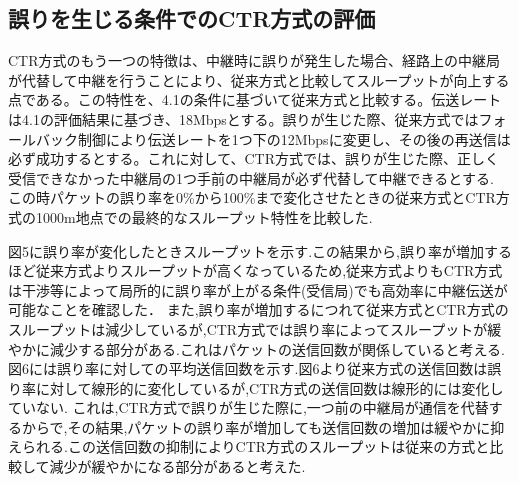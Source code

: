 \documentclass[a4paper,10.5pt]{ltjsarticle}  %
\begin{document}
\subsection{誤りを生じる条件でのCTR方式の評価}
CTR方式のもう一つの特徴は、中継時に誤りが発生した場合、経路上の中継局が代替して中継を行うことにより、従来方式と比較してスループットが向上する点である。この特性を、4.1の条件に基づいて従来方式と比較する。伝送レートは4.1の評価結果に基づき、18Mbpsとする。誤りが生じた際、従来方式ではフォールバック制御により伝送レートを1つ下の12Mbpsに変更し、その後の再送信は必ず成功するとする。これに対して、CTR方式では、誤りが生じた際、正しく受信できなかった中継局の1つ手前の中継局が必ず代替して中継できるとする.
この時パケットの誤り率を0\%から100\%まで変化させたときの従来方式とCTR方式の1000m地点での最終的なスループット特性を比較した.

図5に誤り率が変化したときスループットを示す.この結果から,誤り率が増加するほど従来方式よりスループットが高くなっているため,従来方式よりもCTR方式は干渉等によって局所的に誤り率が上がる条件(受信局)でも高効率に中継伝送が可能なことを確認した．
また,誤り率が増加するにつれて従来方式とCTR方式のスループットは減少しているが,CTR方式では誤り率によってスループットが緩やかに減少する部分がある.これはパケットの送信回数が関係していると考える.図6には誤り率に対しての平均送信回数を示す.図6より従来方式の送信回数は誤り率に対して線形的に変化しているが,CTR方式の送信回数は線形的には変化していない.
これは,CTR方式で誤りが生じた際に,一つ前の中継局が通信を代替するからで,その結果,パケットの誤り率が増加しても送信回数の増加は緩やかに抑えられる.この送信回数の抑制によりCTR方式のスループットは従来の方式と比較して減少が緩やかになる部分があると考えた.
\end{document}
